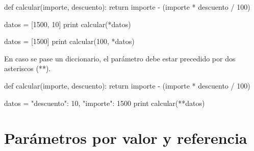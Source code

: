 \begin{pyglist} [language=python]
def calcular(importe, descuento):
    return importe - (importe * descuento / 100)

datos = [1500, 10]
print calcular(*datos)

datos = [1500]
print calcular(100, *datos)
\end{pyglist}

En caso se pase un diccionario, el parámetro debe estar precedido por dos asteriscos (**).

\begin{pyglist} [language=python]
def calcular(importe, descuento):
    return importe - (importe * descuento / 100)
    
datos = {"descuento": 10, "importe": 1500}
print calcular(**datos)
\end{pyglist}

\section{Parámetros por valor y referencia}

